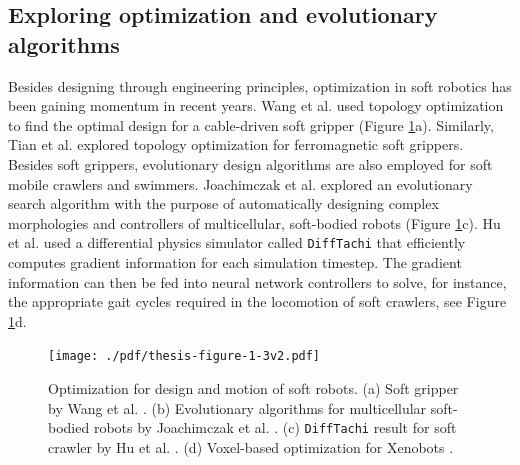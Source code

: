 \subsection{Exploring optimization and evolutionary algorithms}
Besides designing through engineering principles, optimization in soft robotics has been gaining momentum in recent years. Wang et al. \cite{Wang2020Nov} used topology optimization to find the optimal design for a cable-driven soft gripper (Figure \ref{fig:C0:optztypes}a). Similarly, Tian et al. \cite{Tian2020May} explored topology optimization for ferromagnetic soft grippers. Besides soft grippers, evolutionary design algorithms are also employed for soft mobile crawlers and swimmers. Joachimczak et al. \cite{Joachimczak2014Jul,Joachimczak2015} explored an evolutionary search algorithm with the purpose of automatically designing complex morphologies and controllers of multicellular, soft-bodied robots (Figure \ref{fig:C0:optztypes}c). Hu et al. \cite{Hu2019taichi} used a differential physics simulator called \texttt{DiffTachi} that efficiently computes gradient information for each simulation timestep. The gradient information can then be fed into neural network controllers to solve, for instance, the appropriate gait cycles required in the locomotion of soft crawlers, see Figure \ref{fig:C0:optztypes}d.

\begin{figure}[!t]
  \vspace{-3mm}
  \texttt{[image: ./pdf/thesis-figure-1-3v2.pdf]}
  \vspace{-6mm}
  \caption{Optimization for design and motion of soft robots. (a) Soft gripper by Wang et al. \cite{Wang2020Nov}. (b) Evolutionary algorithms for multicellular soft-bodied robots by Joachimczak et al. \cite{Joachimczak2014Jul,Joachimczak2015}. (c) \texttt{DiffTachi} result for soft crawler by Hu et al. \cite{Hu2019taichi}. (d) Voxel-based optimization for Xenobots \cite{Kriegman2019}.}
  \label{fig:C0:optztypes}
  \vspace{-4mm}
\end{figure}

\vspace{-2mm}
